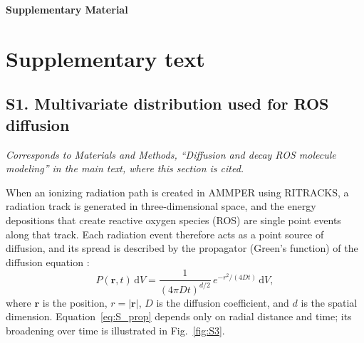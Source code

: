 \documentclass[11pt]{article}
\begin{document}
\begin{center}
{\Large\bfseries Supplementary Material}
\end{center}

\vspace{1em}

\section{Supplementary text}

\subsection{S1. Multivariate distribution used for ROS diffusion}
\label{sec:ros-distribution}

\textit{Corresponds to Materials and Methods, ``Diffusion and decay ROS molecule
modeling'' in the main text, where this section is cited.}

When an ionizing radiation path is created in AMMPER using RITRACKS, a radiation
track is generated in three-dimensional space, and the energy depositions that
create reactive oxygen species (ROS) are single point events along that track.
Each radiation event therefore acts as a point source of diffusion, and its
spread is described by the propagator (Green's function) of the diffusion
equation \citep{saxton2007modeling, boas1984mathematical}:
\begin{equation}
    P(\mathbf{r},t)\,\mathrm{d}V
    = \frac{1}{(4\pi D t)^{d/2}}\,e^{-r^{2}/(4Dt)}\,\mathrm{d}V ,
    \label{eq:S_prop}
\end{equation}
where $\mathbf{r}$ is the position, $r=|\mathbf{r}|$, $D$ is the diffusion
coefficient, and $d$ is the spatial dimension. Equation~\ref{eq:S_prop} depends
only on radial distance and time; its broadening over time is illustrated in
Fig.~\ref{fig:S3}.
\end{document}
